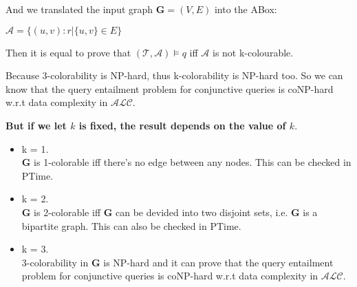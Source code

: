 \documentclass[12pt]{article}
\begin{document}
    And we translated the input graph $\boldsymbol{G} = (V, E)$ into the ABox:

    $\mathcal{A} = \{ (u, v):r | \{ u, v \} \in E \}$

    Then it is equal to prove that $(\mathcal{T}, \mathcal{A}) \models q$ iff $\mathcal{A}$ is not k-colourable.

    Because 3-colorability is NP-hard, thus k-colorability is NP-hard too. So we can know that the query entailment problem for conjunctive queries is coNP-hard w.r.t data complexity in $\mathcal{ALC}$.

    \textbf{But if we let $k$ is fixed, the result depends on the value of $k$}.
    
    \begin{itemize}
        \item k = 1. \\
        $\boldsymbol{G}$ is 1-colorable iff there's no edge between any nodes. This can be checked in PTime.
        \item k = 2. \\
        $\boldsymbol{G}$ is 2-colorable iff $\boldsymbol{G}$ can be devided into two disjoint sets, i.e. $\boldsymbol{G}$ is a bipartite graph. This can also be checked in PTime.
        \item k = 3. \\
        3-colorability in $\boldsymbol{G}$ is NP-hard and it can prove that the query entailment problem for conjunctive queries is coNP-hard w.r.t data complexity in $\mathcal{ALC}$.

    \end{itemize}
\end{document}

